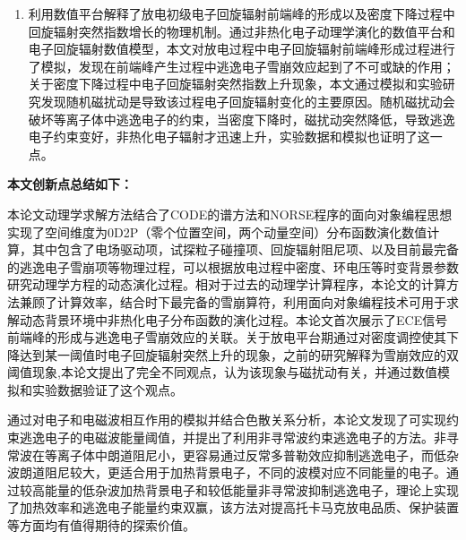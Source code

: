 \begin{enumerate}
\item
利用数值平台解释了放电初级电子回旋辐射前端峰的形成以及密度下降过程中回旋辐射突然指数增长的物理机制。通过非热化电子动理学演化的数值平台和电子回旋辐射数值模型，本文对放电过程中电子回旋辐射前端峰形成过程进行了模拟，发现在前端峰产生过程中逃逸电子雪崩效应起到了不可或缺的作用；关于密度下降过程中电子回旋辐射突然指数上升现象，本文通过模拟和实验研究发现随机磁扰动是导致该过程电子回旋辐射变化的主要原因。随机磁扰动会破坏等离子体中逃逸电子的约束，当密度下降时，磁扰动突然降低，导致逃逸电子约束变好，非热化电子辐射才迅速上升，实验数据和模拟也证明了这一点。
\end{enumerate}
\noindent	\textbf{本文创新点总结如下：} 
\par 本论文动理学求解方法结合了CODE的谱方法和NORSE程序的面向对象编程思想实现了空间维度为0D2P（零个位置空间，两个动量空间）分布函数演化数值计算，其中包含了电场驱动项，试探粒子碰撞项、回旋辐射阻尼项、以及目前最完备的逃逸电子雪崩项等物理过程，可以根据放电过程中密度、环电压等时变背景参数研究动理学方程的动态演化过程。相对于过去的动理学计算程序，本论文的计算方法兼顾了计算效率，结合时下最完备的雪崩算符，利用面向对象编程技术可用于求解动态背景环境中非热化电子分布函数的演化过程。本论文首次展示了ECE信号前端峰的形成与逃逸电子雪崩效应的关联。关于放电平台期通过对密度调控使其下降达到某一阈值时电子回旋辐射突然上升的现象，之前的研究解释为雪崩效应的双阈值现象,本论文提出了完全不同观点，认为该现象与磁扰动有关，并通过数值模拟和实验数据验证了这个观点。
\par 通过对电子和电磁波相互作用的模拟并结合色散关系分析，本论文发现了可实现约束逃逸电子的电磁波能量阈值，并提出了利用非寻常波约束逃逸电子的方法。非寻常波在等离子体中朗道阻尼小，更容易通过反常多普勒效应抑制逃逸电子，而低杂波朗道阻尼较大，更适合用于加热背景电子，不同的波模对应不同能量的电子。通过较高能量的低杂波加热背景电子和较低能量非寻常波抑制逃逸电子，理论上实现了加热效率和逃逸电子能量约束双赢，该方法对提高托卡马克放电品质、保护装置等方面均有值得期待的探索价值。

